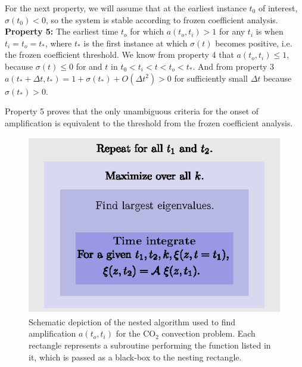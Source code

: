 \documentclass[letterpaper,prl,aps,twocolumn,reprint,superscriptaddress]{revtex4-1}
\newcommand{\cotwo}{CO$_2$ }
\newcommand{\tc}{t_*}
\newcommand{\obs}{o}
\newcommand{\inc}{i}
\begin{document}
For the next property, we will assume that at the earliest instance $t_0$ of interest, $\sigma(t_0)<0$, so the system is stable according to frozen coefficient analysis.
{\bf Property 5:}
The earliest time $t_\obs$ for which $a(t_\obs, t_\inc)>1$ for any $t_\inc$ is when $t_\inc=t_\obs=\tc$, where $\tc$ is the first instance at which $\sigma(t)$ becomes positive, i.e. the frozen coefficient threshold. 
We know from property 4 that $a(t_\obs, t_\inc)\le 1$, because $\sigma(t)\le 0$ for and $t$ in $t_0<t_\inc<t < t_\obs < \tc$. And from property 3 $a(\tc+\Delta t, \tc) = 1 + \sigma(\tc) + O(\Delta t^2) > 0$ for sufficiently small $\Delta t$ because $\sigma(\tc)>0$. 

Property 5 proves that the only unambiguous criteria for the onset of amplification is equivalent to the threshold from the frozen coefficient analysis.

\begin{figure}
 \centering
 \includegraphics{./Figures/Algorithm}
 \caption{Schematic depiction of the nested algorithm used to find amplification $a(t_\obs, t_\inc)$ for the \cotwo convection problem. Each rectangle represents a subroutine performing the function listed in it, which is passed as a black-box to the nesting rectangle.}
 \label{fig:Algorithm}
\end{figure}
\end{document}
